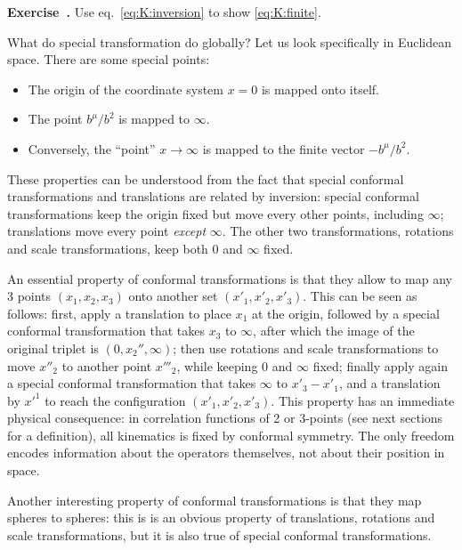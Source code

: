 \documentclass[a4paper,12pt]{article}
\numberwithin{equation}{section}
\newcounter{exercise}[section]
\newenvironment{exercise}[1][]%
	{\refstepcounter{exercise}\bigskip
	\begin{mdframed}[backgroundcolor=gray!20, linewidth=0]
	\noindent\textbf{Exercise~\thesection.\theexercise #1} \rmfamily}
  	{\end{mdframed}\bigskip}
\begin{document}
\begin{exercise}
	Use eq.~\eqref{eq:K:inversion} to show \eqref{eq:K:finite}.
\end{exercise}

What do special transformation do globally?
Let us look specifically in Euclidean space. There are some special points:
\begin{itemize}

\item
The origin of the coordinate system $x = 0$ is mapped onto itself.

\item
The point $b^\mu / b^2$ is mapped to $\infty$. 

\item
Conversely, the ``point'' $x \to \infty$ is mapped to the finite vector $-b^\mu/b^2$.

\end{itemize}
%
These properties can be understood from the fact that special conformal transformations and translations are related by inversion:
special conformal transformations keep the origin fixed but move every other points, including $\infty$; translations move every point \emph{except} $\infty$. The other two transformations, rotations and scale transformations, keep both $0$ and $\infty$ fixed.


An essential property of conformal transformations is that they allow to map any 3 points $(x_1, x_2, x_3)$ onto another set $( x'_1, x'_2, x'_3)$. This can be seen as follows: first, apply a translation to place $x_1$ at the origin, followed by a special conformal transformation that takes $x_3$ to $\infty$, after which the image of the original triplet is $(0, x_2'', \infty)$; then use rotations and scale transformations to move $x''_2$ to another point $x'''_2$, while keeping $0$ and $\infty$ fixed; finally apply again a special conformal transformation that takes $\infty$ to $x'_3 - x'_1$, and a translation by $x'^1$ to reach the configuration $( x'_1, x'_2, x'_3)$.
This property has an immediate physical consequence: in correlation functions of 2 or 3-points (see next sections for a definition), all kinematics is fixed by conformal symmetry. The only freedom encodes information about the operators themselves, not about their position in space.

Another interesting property of conformal transformations is that they map spheres to spheres: this is is an obvious property of translations, rotations and scale transformations, but it is also true of special conformal transformations. 
\end{document}
